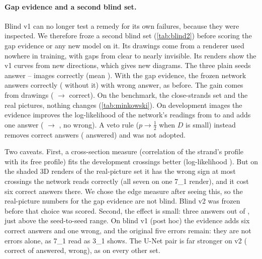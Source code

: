 \begin{table}[t]
\centering\footnotesize
\setlength{\tabcolsep}{3pt}
\caption{\textbf{Blind set v2} (\VtwoN{} images, frozen before any model or setting in this
table was scored on it, never viewed: \VtwoDrawN{} line drawings with halo gaps of 0.1--0.8 line
widths, \VtwoRendN{} POV-Ray renders from new viewpoints). Correct = same type up to mirror image.}
\label{tab:blind2}
\end{table}

\paragraph{Gap evidence and a second blind set.} Blind v1 can no longer test a remedy for its own
failures, because they were inspected. We therefore froze a second blind set
(\cref{tab:blind2}) before scoring the gap evidence or any new model on it. Its drawings come
from a renderer used nowhere in training, with gaps from clear to nearly invisible. Its renders
show the v1 curves from new directions, which gives new diagrams. The three plain seeds answer
\PlainVtwoMin--\PlainVtwoMax{} images correctly (mean \PlainVtwoCorrect). With the gap evidence,
the frozen network answers \GapVtwoCorrect{} correctly (\FrozenVtwoCorrect{} without it) with
\GapVtwoWrong{} wrong answer, as before. The gain comes from drawings (\FrozenVtwoDrawCorrect{}
$\to$ \GapVtwoDrawCorrect{} correct). On the benchmark, the close-strands set and the real pictures,
nothing changes (\cref{tab:minkowski}). On development images the evidence improves the
log-likelihood of the network's \ou{} readings from \GapLLnone{} to \GapLLedge{} and adds one
answer (\GapDevNoCheckAns{} $\to$ \GapDevAns{}, no wrong). A veto rule ($p\to\frac12$ when $D$ is
small) instead removes correct answers (\GapVetoAns{} answered) and was not adopted.

Two caveats. First, a cross-section measure (correlation of the strand's profile with its free
profile) fits the development crossings better (log-likelihood \GapLLxsec). But on the shaded 3D
renders of the real-picture set it has the wrong sign at most crossings the network reads correctly
(all seven on one 7\_1 render), and it cost six correct answers there. We chose the edge measure after seeing this, so the
real-picture numbers for the gap evidence are not blind. Blind v2 was frozen before that choice
was scored. Second, the effect is small: three answers out of \VtwoN{}, just above the
seed-to-seed range. On blind v1 (post hoc) the evidence adds six correct answers and one
wrong, and the original five errors remain: they are not \ou{} errors alone, as 7\_1 read as
3\_1 shows. The U-Net pair is far stronger on v2 (\UPVtwoCorrect{} correct of \UPVtwoAns{}
answered, \UPVtwoWrong{} wrong), as on every other set.

